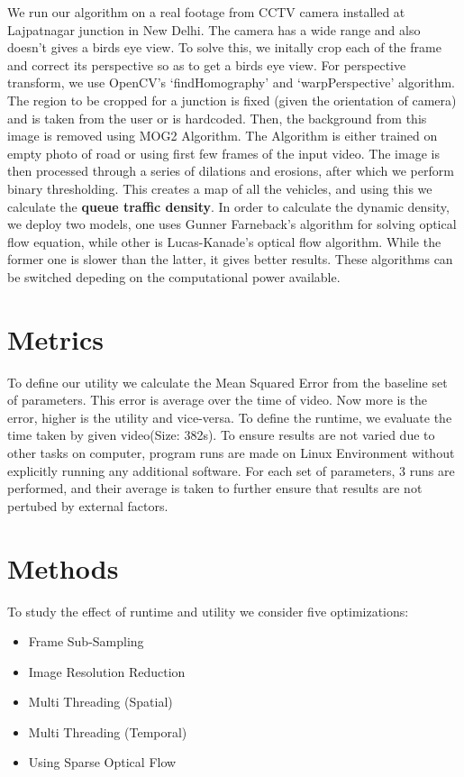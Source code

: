 \documentclass[conference]{IEEEtran}
\begin{document}
We run our algorithm on a real footage from CCTV camera installed at Lajpatnagar junction in New Delhi. \cite{b1}
The camera has a wide range and also doesn't gives a birds eye view. To solve this, we initally crop each of the frame and correct its perspective so as to get a birds eye view. 
For perspective transform, we use OpenCV's `findHomography' and `warpPerspective' algorithm. \cite{b2}
The region to be cropped for a junction is fixed (given the orientation of camera) and is taken from the user or is hardcoded.
Then, the background from this image is removed using MOG2 Algorithm. The Algorithm is either trained on empty photo of road or using first few frames of the input video.
The image is then processed through a series of dilations and erosions, after which we perform binary thresholding. This creates a map of all the vehicles, and using this we calculate the {\bfseries{queue traffic density}}. 
In order to calculate the dynamic density, we deploy two models, one uses Gunner Farneback's algorithm for solving optical flow equation, while other is Lucas-Kanade's optical flow algorithm. \cite{b4} \cite{b5}
While the former one is slower than the latter, it gives better results. These algorithms can be switched depeding on the computational power available.

\section{Metrics}

To define our utility we calculate the Mean Squared Error from the baseline set of parameters. This error is average over the time of video. Now more is the error, higher is the utility and vice-versa.
To define the runtime, we evaluate the time taken by given video(Size: 382s). To ensure results are not varied due to other tasks on computer, 
program runs are made on Linux Environment without explicitly running any additional software. For each set of parameters, 3 runs are performed, and their average is taken to further ensure that results are not pertubed by external factors.
\section{Methods}

To study the effect of runtime and utility we consider five optimizations:
\begin{itemize}
    \item Frame Sub-Sampling
    \item Image Resolution Reduction
    \item Multi Threading (Spatial)
    \item Multi Threading (Temporal)
    \item Using Sparse Optical Flow
\end{itemize}
\end{document}
